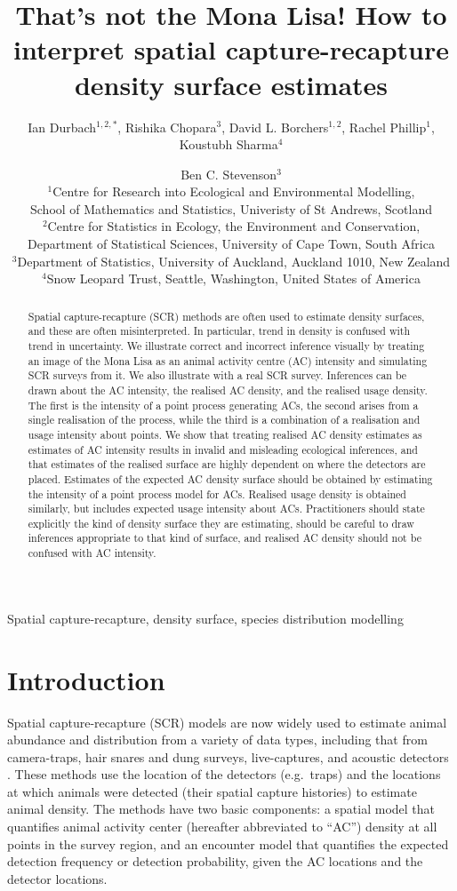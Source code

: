 \documentclass[useAMS,usenatbib,referee]{biom}
\title[How to interpret SCR density surface estimates]{That's not the Mona Lisa! How to interpret spatial capture-recapture density surface estimates}
\author{Ian Durbach$^{1,2,*}$, Rishika Chopara$^{3}$, David L. Borchers$^{1,2}$, Rachel Phillip$^{1}$, Koustubh Sharma$^{4}$ \and Ben C. Stevenson$^{3}$ \\
$^{1}$Centre for Research into Ecological and Environmental Modelling, \\ School of Mathematics and Statistics, Univeristy of St Andrews, Scotland \\
$^{2}$Centre for Statistics in Ecology, the Environment and Conservation, \\ Department of Statistical Sciences, University of Cape Town, South Africa \\
$^{3}$Department of Statistics, University of Auckland, Auckland 1010, New Zealand \\
$^{4}$Snow Leopard Trust, Seattle, Washington, United States of America \\
\email{indurbach@gmail.com}}
\begin{document}

\begin{abstract}
Spatial capture-recapture (SCR) methods are often used to estimate density surfaces, and these are often misinterpreted. In particular, trend in density is confused with trend in uncertainty. We illustrate correct and incorrect inference visually by treating an image of the Mona Lisa as an animal activity centre (AC) intensity and simulating SCR surveys from it. We also illustrate with a real SCR survey. Inferences can be drawn about the AC intensity, the realised AC density, and the realised usage density. The first is the intensity of a point process generating ACs, the second arises from a single realisation of the process, while the third is a combination of a realisation and usage intensity about points. We show that treating realised AC density estimates as estimates of AC intensity results in invalid and misleading ecological inferences, and that estimates of the realised surface are highly dependent on where the detectors are placed. Estimates of the expected AC density surface should be obtained by estimating the intensity of a point process model for ACs. Realised usage density is obtained similarly, but includes expected usage intensity about ACs. Practitioners should state explicitly the kind of density surface they are estimating, should be careful to draw inferences appropriate to that kind of surface, and realised AC density should not be confused with AC intensity.
\end{abstract}

\begin{keywords}
Spatial capture-recapture, density surface, species distribution modelling
\end{keywords}

\maketitle 

\section{Introduction}

Spatial capture-recapture (SCR) models \citep*{Efford:04,Borchers+Efford:08, Royle+Young:08} are now widely used to estimate animal abundance and distribution from a variety of data types, including that from camera-traps, hair snares and dung surveys, live-captures, and acoustic detectors%
. These methods use the location of the detectors (e.g.\ traps) and the locations at which animals were detected (their spatial capture histories) to estimate animal density. The methods have two basic components: a spatial model that quantifies animal activity center (hereafter abbreviated to ``AC'') density at all points in the survey region, and an encounter model that quantifies the expected detection frequency or detection probability, given the AC locations and the detector locations. 
\end{document}
